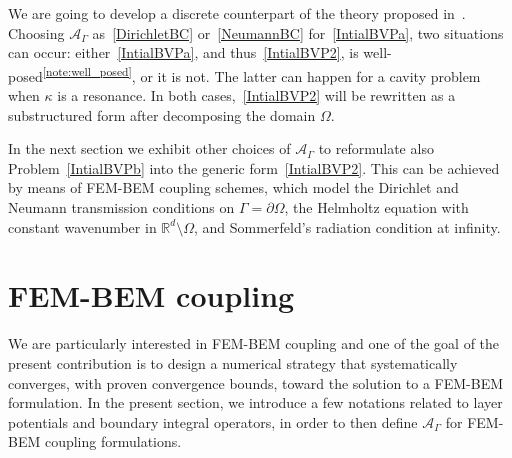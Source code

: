 \documentclass[a4paper,11pt]{article}
\newcommand{\RR}{\mathbb{R}}
\begin{document}
We are going to develop a discrete counterpart of the theory proposed in~\cite{MR4665035}. Choosing $\mathcal{A}_{\Gamma}$ as~\eqref{DirichletBC} or~\eqref{NeumannBC} for~\eqref{IntialBVPa}, two situations can occur: either~\eqref{IntialBVPa}, and thus~\eqref{IntialBVP2}, is well-posed\textsuperscript{\ref{note:well_posed}}, or it is not. The latter can happen for a cavity problem when \(\kappa\) is a resonance. In both cases,~\eqref{IntialBVP2} will be rewritten as a substructured form after decomposing the domain \(\Omega\).

\medskip
In the next section we exhibit other choices of $\mathcal{A}_{\Gamma}$
to reformulate also Problem~\eqref{IntialBVPb} into the generic form~\eqref{IntialBVP2}. This can be achieved by means of FEM-BEM coupling
schemes, which model the Dirichlet and Neumann transmission conditions
on $\Gamma = \partial \Omega$, the Helmholtz equation with constant
wavenumber in $\RR^d\setminus\Omega$, and Sommerfeld's radiation
condition at infinity.



\section{FEM-BEM coupling}\label{FEMBEMCoupling}

We are particularly interested in FEM-BEM coupling and one of the goal
of the present contribution is to design a numerical strategy that
systematically converges, with proven convergence bounds, toward the
solution to a FEM-BEM formulation. In the present section, we 
introduce a few notations related to layer potentials and boundary
integral operators, in order to then define $\mathcal{A}_{\Gamma}$ for
FEM-BEM coupling formulations.
\end{document}
